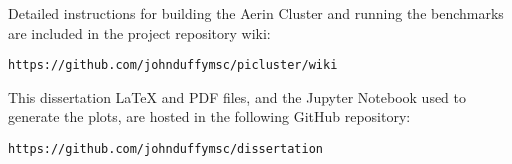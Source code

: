 Detailed instructions for building the Aerin Cluster and running the benchmarks are included in the project repository wiki:

\begin{verbatim}
https://github.com/johnduffymsc/picluster/wiki
\end{verbatim}

This dissertation \LaTeX{} and PDF files, and the Jupyter Notebook used to generate the plots, are hosted in the following GitHub repository:

\begin{verbatim}
https://github.com/johnduffymsc/dissertation
\end{verbatim}
 


